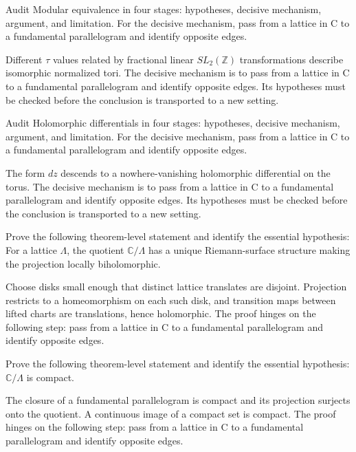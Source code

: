 \begin{problem}\label{prob:iv27-problem-07}
Audit Modular equivalence in four stages: hypotheses, decisive mechanism, argument, and limitation. For the decisive mechanism, pass from a lattice in C to a fundamental parallelogram and identify opposite edges.
\end{problem}
\begin{solution}
Different $\tau$ values related by fractional linear $SL_2(\mathbb Z)$ transformations describe isomorphic normalized tori. The decisive mechanism is to pass from a lattice in C to a fundamental parallelogram and identify opposite edges. Its hypotheses must be checked before the conclusion is transported to a new setting.
\end{solution}

\begin{problem}\label{prob:iv27-problem-08}
Audit Holomorphic differentials in four stages: hypotheses, decisive mechanism, argument, and limitation. For the decisive mechanism, pass from a lattice in C to a fundamental parallelogram and identify opposite edges.
\end{problem}
\begin{solution}
The form $dz$ descends to a nowhere-vanishing holomorphic differential on the torus. The decisive mechanism is to pass from a lattice in C to a fundamental parallelogram and identify opposite edges. Its hypotheses must be checked before the conclusion is transported to a new setting.
\end{solution}

\begin{problem}\label{prob:iv27-problem-09}
Prove the following theorem-level statement and identify the essential hypothesis: For a lattice $\Lambda$, the quotient $\mathbb C/\Lambda$ has a unique Riemann-surface structure making the projection locally biholomorphic.
\end{problem}
\begin{solution}
Choose disks small enough that distinct lattice translates are disjoint. Projection restricts to a homeomorphism on each such disk, and transition maps between lifted charts are translations, hence holomorphic. The proof hinges on the following step: pass from a lattice in C to a fundamental parallelogram and identify opposite edges.
\end{solution}

\begin{problem}\label{prob:iv27-problem-10}
Prove the following theorem-level statement and identify the essential hypothesis: $\mathbb C/\Lambda$ is compact.
\end{problem}
\begin{solution}
The closure of a fundamental parallelogram is compact and its projection surjects onto the quotient. A continuous image of a compact set is compact. The proof hinges on the following step: pass from a lattice in C to a fundamental parallelogram and identify opposite edges.
\end{solution}

